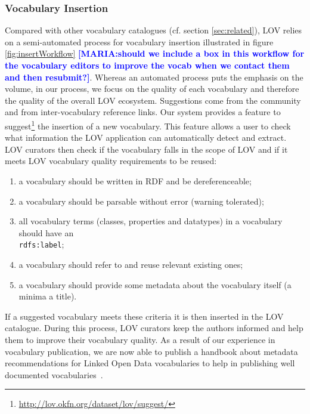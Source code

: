 \documentclass{iosart2c}
\newcommand{\maria}[1]{\textcolor{blue}{\textbf{[MARIA:#1]}}}
\begin{document}
	\subsubsection{Vocabulary Insertion}\label{sssec:vocabInsert} Compared with other vocabulary catalogues (cf. section \ref{sec:related}), LOV relies on a semi-automated process for vocabulary insertion illustrated in figure \ref{fig:insertWorkflow} \maria{should we include a box in this workflow for the vocabulary editors to improve the vocab when we contact them and then resubmit?}. Whereas an automated process puts the emphasis on the volume, in our process, we focus on the quality of each vocabulary and therefore the quality of the overall LOV ecosystem. Suggestions come from the community and from inter-vocabulary reference links. Our system provides a feature to suggest\footnote{\url{http://lov.okfn.org/dataset/lov/suggest/}} the insertion of a new vocabulary. This feature allows a user to check what information the LOV application can automatically detect and extract. LOV curators then check if the vocabulary falls in the scope of LOV and if it meets LOV vocabulary quality requirements to be reused:
\begin{enumerate}
 \item a vocabulary should be written in RDF and be dereferenceable;
 \item a vocabulary should be parsable without error (warning tolerated);
 \item all vocabulary terms (classes, properties and datatypes) in a vocabulary should have an \\ \texttt{rdfs:label};
 \item a vocabulary should refer to and reuse relevant existing ones;
 \item a vocabulary should provide some metadata about the vocabulary itself (a minima a title).
\end{enumerate}
If a suggested vocabulary meets these criteria it is then inserted in the LOV catalogue. During this process, LOV curators keep the authors informed and help them to improve their vocabulary quality. As a result of our experience in vocabulary publication, we are now able to publish a handbook about metadata recommendations for Linked Open Data vocabularies to help in publishing well documented vocabularies~\cite{vandenbussche2011metadata}.
\end{document}

